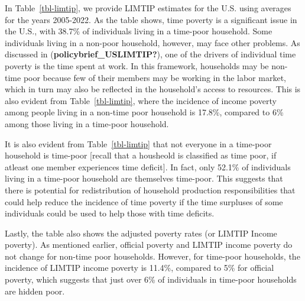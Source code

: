 \documentclass[
  11pt,
]{article}
\begin{document}
In Table~\ref{tbl-limtip}, we provide LIMTIP estimates for the U.S.
using averages for the years 2005-2022. As the table shows, time poverty
is a significant issue in the U.S., with 38.7\% of individuals living in
a time-poor household. Some individuals living in a non-poor household,
however, may face other problems. As discussed in
(\textbf{policybrief\_USLIMTIP?}), one of the drivers of individual time
poverty is the time spent at work. In this framework, households may be
non-time poor because few of their members may be working in the labor
market, which in turn may also be reflected in the household's access to
resources. This is also evident from Table~\ref{tbl-limtip}, where the
incidence of income poverty among people living in a non-time poor
household is 17.8\%, compared to 6\% among those living in a time-poor
household.

It is also evident from Table~\ref{tbl-limtip} that not everyone in a
time-poor household is time-poor {[}recall that a housheold is
classified as time poor, if atleast one member experiences time
deficit{]}. In fact, only 52.1\% of individuals living in a time-poor
household are themselves time-poor. This suggests that there is
potential for redistribution of household production responsibilities
that could help reduce the incidence of time poverty if the time
surpluses of some individuals could be used to help those with time
deficits.

Lastly, the table also shows the adjusted poverty rates (or LIMTIP
Income poverty). As mentioned earlier, official poverty and LIMTIP
income poverty do not change for non-time poor households. However, for
time-poor households, the incidence of LIMTIP income poverty is 11.4\%,
compared to 5\% for official poverty, which suggests that just over 6\%
of individuals in time-poor households are hidden poor.

\begin{table}[H]

\caption{\label{tbl-limtip}Poverty Rates by Household Time Poverty
Status}


\end{table}%
\end{document}
